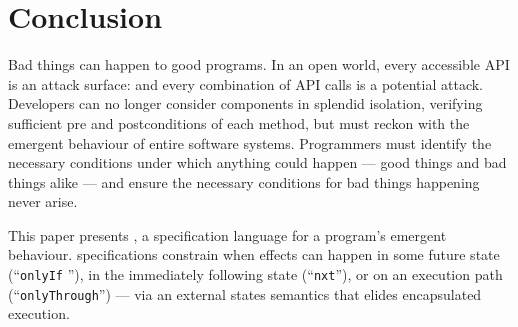 \section{Conclusion}
\label{s:conclusion}

Bad things can happen to good programs. In an open world, every
accessible API is an attack surface: and every combination of
API calls is a potential attack.  Developers can no longer consider
components in splendid isolation, verifying sufficient pre and
postconditions of each method, but must reckon with the emergent
behaviour of entire software systems. Programmers
must identify the necessary conditions under which anything could
happen \cite{anything} --- good things and bad things alike --- and
ensure the necessary conditions for bad things happening never arise.



This paper presents 
\Nec, a specification language for a program's
emergent behaviour.
\Nec specifications
constrain when effects can happen in some future state
(``\texttt{\color{blue}onlyIf} ''),
in the immediately following state (``\texttt{\color{blue}nxt}''), or
on an execution path 
(``\texttt{\color{blue}onlyThrough}'') --- via an external states
semantics that elides encapsulated execution.



 
